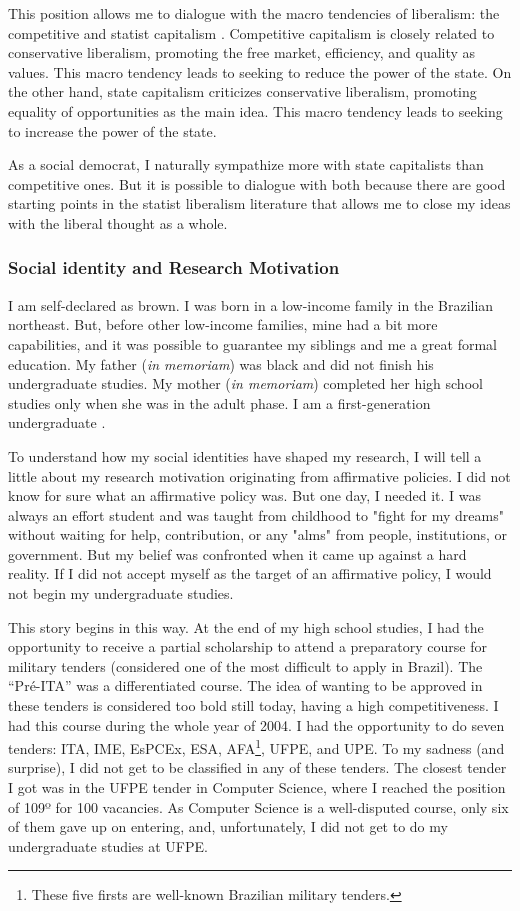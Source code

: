 This position allows me to dialogue with the macro tendencies of liberalism: the competitive and statist capitalism \cite[pp.~84-95]{libaneo:2011}. Competitive capitalism is closely related to conservative liberalism, promoting the free market, efficiency, and quality as values. This macro tendency leads to seeking to reduce the power of the state. On the other hand, state capitalism criticizes conservative liberalism, promoting equality of opportunities as the main idea. This macro tendency leads to seeking to increase the power of the state. 

As a social democrat, I naturally sympathize more with state capitalists than competitive ones. But it is possible to dialogue with both because there are good starting points in the statist liberalism literature that allows me to close my ideas with the liberal thought as a whole.

\subsubsection{Social identity and Research Motivation}

I am self-declared as brown. I was born in a low-income family in the Brazilian northeast. But, before other low-income families, mine had a bit more capabilities, and it was possible to guarantee my siblings and me a great formal education. My father (\textit{in memoriam}) was black and did not finish his undergraduate studies. My mother (\textit{in memoriam}) completed her high school studies only when she was in the adult phase. I am a first-generation undergraduate \cite{ives:2020}.

To understand how my social identities have shaped my research, I will tell a little about my research motivation originating from affirmative policies. I did not know for sure what an affirmative policy was. But one day, I needed it. I was always an effort student and was taught from childhood to "fight for my dreams" without waiting for help, contribution, or any "alms" from people, institutions, or government. But my belief was confronted when it came up against a hard reality. If I did not accept myself as the target of an affirmative policy, I would not begin my undergraduate studies.

This story begins in this way. At the end of my high school studies, I had the opportunity to receive a partial scholarship to attend a preparatory course for military tenders (considered one of the most difficult to apply in Brazil). The “Pré-ITA” was a differentiated course. The idea of wanting to be approved in these tenders is considered too bold still today, having a high competitiveness. I had this course during the whole year of 2004. I had the opportunity to do seven tenders: ITA, IME, EsPCEx, ESA, AFA\footnote{These five firsts are well-known Brazilian military tenders.}, \gls{UFPE}, and \gls{UPE}. To my sadness (and surprise), I did not get to be classified in any of these tenders. The closest tender I got was in the \gls{UFPE} tender in Computer Science, where I reached the position of 109º for 100 vacancies. As Computer Science is a well-disputed course, only six of them gave up on entering, and, unfortunately, I did not get to do my undergraduate studies at \gls{UFPE}.

